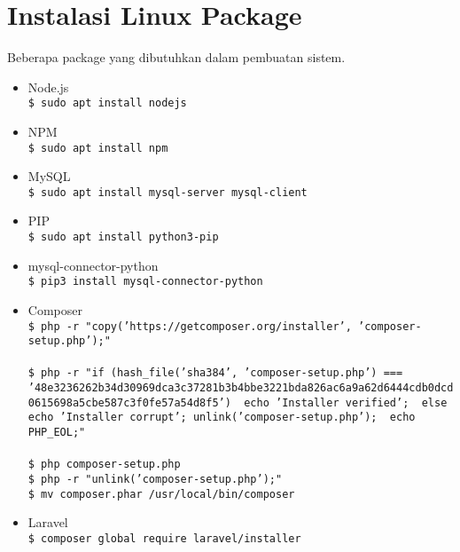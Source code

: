 \section*{Instalasi Linux Package}
Beberapa package yang dibutuhkan dalam pembuatan sistem.
\begin{itemize}
	\item Node.js \\
		\texttt{\$ sudo apt install nodejs}\\
	\item NPM \\
		\texttt{\$ sudo apt install npm}\\
	\item MySQL \\
		\texttt{\$ sudo apt install mysql-server mysql-client}\\
	\item PIP \\
		\texttt{\$ sudo apt install python3-pip}\\
	\item mysql-connector-python \\
		\texttt{\$ pip3 install mysql-connector-python}\\
	\item Composer \\
		\texttt{\$ php -r "copy('https://getcomposer.org/installer', 'composer-setup.php');"} \\ \\
		\texttt{\$ php -r "if (hash\_file('sha384', 'composer-setup.php') === '48e3236262b34d30969dca3c37281b3b4bbe3221bda826ac6a9a62d6444cdb0dcd0615698a5cbe587c3f0fe57a54d8f5') { echo 'Installer verified'; } else { echo 'Installer corrupt'; unlink('composer-setup.php'); } echo PHP\_EOL;"}\\ \\
		\texttt{\$ php composer-setup.php} \\
		\texttt{\$ php -r "unlink('composer-setup.php');"} \\
		\texttt{\$ mv composer.phar /usr/local/bin/composer} \\
	\item Laravel \\
		\texttt{\$ composer global require laravel/installer}\\
\end{itemize}